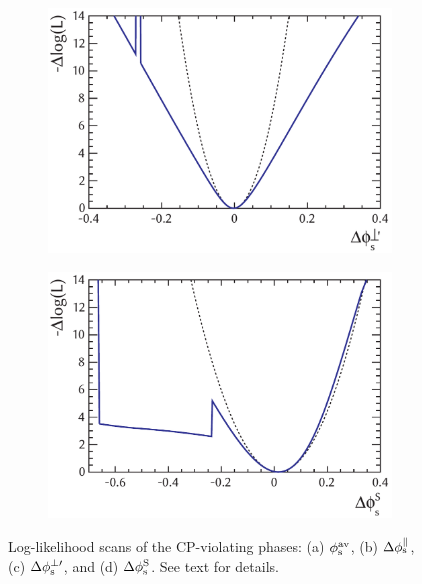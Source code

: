 \begin{figure}[tbp]
  \vspace*{0.02\textwidth}
  \begin{subfigure}{0.49\textwidth}
    \includegraphics[width=\textwidth]{graphics/results/NLL_polarDep_phiCPRel_AperpApar}
    \caption{}
  \end{subfigure}
  \hfill%
  \begin{subfigure}{0.49\textwidth}
    \includegraphics[width=\textwidth]{graphics/results/NLL_polarDep_phiCPRel_AS}
    \caption{}
  \end{subfigure}

  \caption{Log-likelihood scans of the CP-violating phases: (a) $\phi_\text{s}^{\text{av}}$, (b) $\Delta\phi_\text{s}^\parallel$, (c) $\Delta\phi_\text{s}^{\perp\prime}$, and (d) $\Delta\phi_\text{s}^\text{S}$.
           See text for details.}
  \label{fig:NLL_CPV_phases}
\end{figure}

